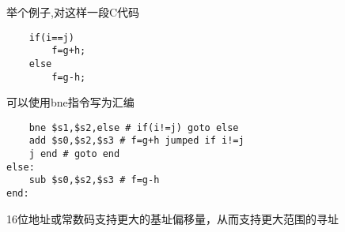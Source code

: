 举个例子,对这样一段C代码
\begin{lstlisting}
    if(i==j)
        f=g+h;
    else
        f=g-h;
\end{lstlisting}
可以使用bne指令写为汇编
\begin{lstlisting}
    bne $s1,$s2,else # if(i!=j) goto else
    add $s0,$s2,$s3 # f=g+h jumped if i!=j
    j end # goto end
else:
    sub $s0,$s2,$s3 # f=g-h
end:
\end{lstlisting}
16位地址或常数码支持更大的基址偏移量，从而支持更大范围的寻址\\



